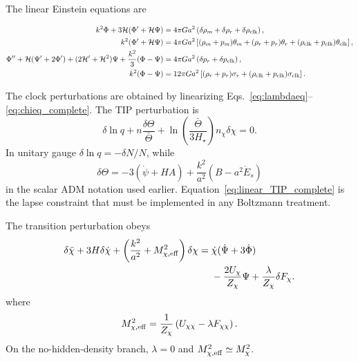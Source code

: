 \documentclass[aps,prd,reprint,nofootinbib,superscriptaddress,longbibliography]{revtex4-2}
\begin{document}
The linear Einstein equations are
\begin{widetext}
\begin{align}
  k^2\Phi+3\mathcal H(\Phi'+\mathcal H\Psi)
  &=4\pi G a^2\left(\delta\rho_m+\delta\rho_r+\delta\rho_{\rm clk}\right),\label{eq:Einstein00pert}\\
  k^2(\Phi'+\mathcal H\Psi)
  &=4\pi G a^2\left[(\rho_m+p_m)\theta_m+(\rho_r+p_r)\theta_r
  +(\rho_{\rm clk}+p_{\rm clk})\theta_{\rm clk}\right],\label{eq:Einstein0ipert}\\
  \Phi''+\mathcal H(\Psi'+2\Phi')+(2\mathcal H'+\mathcal H^2)\Psi
  +\frac{k^2}{3}(\Phi-\Psi)
  &=4\pi G a^2\left(\delta p_r+\delta p_{\rm clk}\right),\label{eq:Einsteintracepert}\\
  k^2(\Phi-\Psi)
  &=12\pi G a^2\left[(\rho_r+p_r)\sigma_r+(\rho_{\rm clk}+p_{\rm clk})\sigma_{\rm clk}\right].\label{eq:Einsteinanispert}
\end{align}
\end{widetext}
The clock perturbations are obtained by linearizing Eqs.~\eqref{eq:lambdaeq}--\eqref{eq:chieq_complete}.  The TIP perturbation is
\begin{equation}
  \delta\ln q+n\frac{\delta\Theta}{\bar\Theta}
  +\ln\left(\frac{\bar\Theta}{3H_\star}\right)n_\chi\delta\chi=0 .
  \label{eq:linear_TIP_complete}
\end{equation}
In unitary gauge $\delta\ln q=-\delta N/N$, while
\begin{equation}
  \delta\Theta=-3(\dot\psi+HA)+\frac{k^2}{a^2}\left(B-a^2\dot E_s\right)
  \label{eq:deltatheta_complete}
\end{equation}
in the scalar ADM notation used earlier.  Equation~\eqref{eq:linear_TIP_complete} is the lapse constraint that must be implemented in any Boltzmann treatment.

The transition perturbation obeys
\begin{align}
  \delta\ddot\chi+3H\delta\dot\chi+
  \left(\frac{k^2}{a^2}+M_{\chi,\rm eff}^2\right)\delta\chi
  ={}&\dot\chi(\dot\Psi+3\dot\Phi)\nonumber\\
  &-\frac{2U_\chi}{Z_\chi}\Psi+\frac{\lambda}{Z_\chi}\delta F_\chi .
  \label{eq:deltachi_complete}
\end{align}
where
\begin{equation}
  M_{\chi,\rm eff}^2=\frac{1}{Z_\chi}\left(U_{\chi\chi}-\lambda F_{\chi\chi}\right).
  \label{eq:Meffchi}
\end{equation}
On the no-hidden-density branch, $\lambda=0$ and $M_{\chi,\rm eff}^2\simeq M_\chi^2$.
\end{document}
